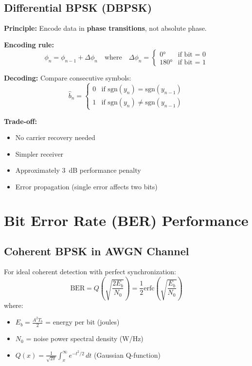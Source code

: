 \subsection{Differential BPSK (DBPSK)}

\textbf{Principle:} Encode data in \textbf{phase transitions}, not absolute phase.

\textbf{Encoding rule:}
\begin{equation}
\phi_n = \phi_{n-1} + \Delta\phi_n \quad\text{where}\quad \Delta\phi_n = \begin{cases}
0° & \text{if bit = 0} \\
180° & \text{if bit = 1}
\end{cases}
\end{equation}

\textbf{Decoding:} Compare consecutive symbols:
\begin{equation}
\hat{b}_n = \begin{cases}
0 & \text{if } \mathrm{sgn}(y_n) = \mathrm{sgn}(y_{n-1}) \\
1 & \text{if } \mathrm{sgn}(y_n) \neq \mathrm{sgn}(y_{n-1})
\end{cases}
\end{equation}

\textbf{Trade-off:}
\begin{itemize}
\item[\checkmark] No carrier recovery needed
\item[\checkmark] Simpler receiver
\item[\texttimes] Approximately 3~dB performance penalty
\item[\texttimes] Error propagation (single error affects two bits)
\end{itemize}

\section{Bit Error Rate (BER) Performance}

\subsection{Coherent BPSK in AWGN Channel}

For ideal coherent detection with perfect synchronization:
\begin{equation}
\mathrm{BER} = Q\left(\sqrt{\frac{2E_b}{N_0}}\right) = \frac{1}{2}\mathrm{erfc}\left(\sqrt{\frac{E_b}{N_0}}\right)
\end{equation}
where:
\begin{itemize}
\item $E_b = \frac{A^2 T_b}{2}$ = energy per bit (joules)
\item $N_0$ = noise power spectral density (W/Hz)
\item $Q(x) = \frac{1}{\sqrt{2\pi}}\int_x^\infty e^{-t^2/2}\,dt$ (Gaussian Q-function)
\end{itemize}

